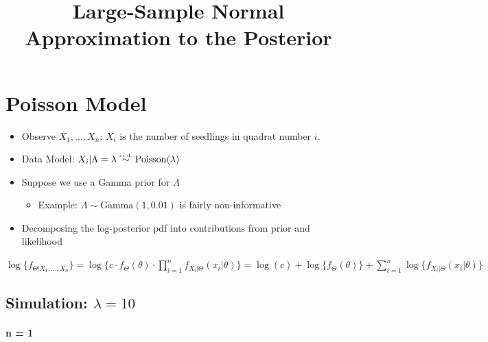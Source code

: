 \documentclass[]{article}
\title{Large-Sample Normal Approximation to the Posterior}
\author{}
\date{}
\providecommand{\tightlist}{%
  \setlength{\itemsep}{0pt}\setlength{\parskip}{0pt}}
\let\oldparagraph\paragraph
\renewcommand{\paragraph}[1]{\oldparagraph{#1}\mbox{}}
\begin{document}
\maketitle

\def\simiid{\stackrel{{\mbox{\text{\tiny i.i.d.}}}}{\sim}}

\section{Poisson Model}\label{poisson-model}

\begin{itemize}
\tightlist
\item
  Observe \(X_1, \ldots, X_n\); \(X_i\) is the number of seedlings in
  quadrat number \(i\).
\item
  Data Model:
  \(X_i | \Lambda = \lambda \simiid \text{Poisson}(\lambda)\)
\item
  Suppose we use a Gamma prior for \(\Lambda\)

  \begin{itemize}
  \tightlist
  \item
    Example: \(\Lambda \sim \text{Gamma}(1, 0.01)\) is fairly
    non-informative
  \end{itemize}
\item
  Decomposing the log-posterior pdf into contributions from prior and
  likelihood
\end{itemize}

\(\log\{f_{\Theta | X_1, \ldots, X_n}\} = \log\{ c \cdot f_{\Theta}(\theta) \cdot \prod_{i=1}^n f_{X_i|\Theta}(x_i | \theta) \} = \log(c) + \log\{f_{\Theta}(\theta)\} + \sum_{i=1}^n \log\{ f_{X_i|\Theta}(x_i | \theta) \}\)

\subsection{\texorpdfstring{Simulation:
\(\lambda = 10\)}{Simulation: \textbackslash{}lambda = 10}}\label{simulation-lambda-10}

\paragraph{n = 1}\label{n-1}
\end{document}

